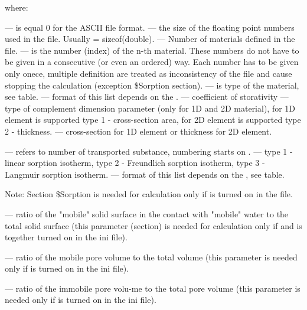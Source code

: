where:
\begin{description}
  --- is equal 0 for the ASCII file format.
  --- the size of the floating point numbers used in
  the file. Usually  = sizeof(double).
  --- Number of materials defined in the
  file.
  --- is the number (index) of the n-th
  material. These numbers do not have to be given in a consecutive (or even an
  ordered) way. Each number has to be given only onece, multiple definition
  are treated as inconsistency of the file and cause stopping the
  calculation (exception \$Sorption section).
  --- is type of the material, see table.
  --- format of this list depends on the
  .
  --- coefficient of storativity  
  --- type of complement dimension parameter (only for 1D and 2D material), 
 for 1D element is supported type 1 - cross-section area, for 2D element is supported type 2
 - thickness.  
  --- cross-section for 1D
 element or thickness for 2D element. 
 
  --- refers to number of transported substance, numbering starts on .
  --- type 1 - linear sorption isotherm,
                             type 2 - Freundlich sorption isotherm,
                             type 3 - Langmuir sorption isotherm.
  --- format of this list depends on the
  , see table. 
  
 Note: Section \$Sorption is needed for calculation only if  is
   turned on in the  file.
 
  --- ratio of the "mobile" solid surface in the contact with "mobile" water to the total solid
 surface (this parameter (section) is needed for calculation only if  and  is 
 together turned on in the ini file).                        
  
  --- ratio of the mobile pore volume to the
 total volume (this parameter is needed only if  is turned on in the ini file).  
                       
  --- ratio of the immobile pore volu-me to the
 total pore volume (this parameter is needed only if  is turned on in the ini file).                      
 

\end{description}
